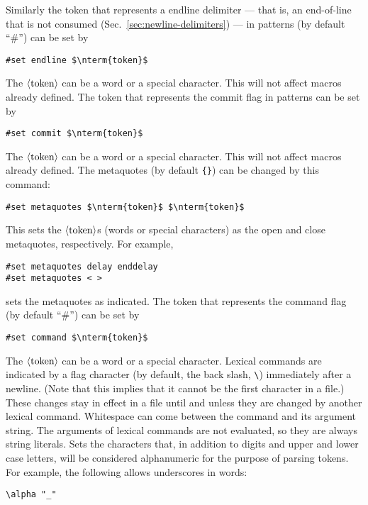 \documentclass[12pt]{article}
\begin{document}
Similarly the token that represents a endline delimiter --- that is, an end-of-line that is not consumed (Sec.\ \ref{sec:newline-delimiters}) --- in patterns (by default ``\#'') can be set by
\begin{lstlisting}[frame=single,mathescape]
#set endline $\nterm{token}$
\end{lstlisting}
The $\langle\mbox{token}\rangle$ can be a word or a special character.
This will not affect macros already defined.
The token that represents the commit flag in patterns can be set by
\begin{lstlisting}[frame=single,mathescape]
#set commit $\nterm{token}$
\end{lstlisting}
The $\langle\mbox{token}\rangle$ can be a word or a special character.
This will not affect macros already defined.
The metaquotes (by default \lstinline"{}") can be changed by this command:
\begin{lstlisting}[frame=single,mathescape]
#set metaquotes $\nterm{token}$ $\nterm{token}$
\end{lstlisting}
This sets the $\langle\mbox{token}\rangle$s (words or special characters) as the open and close metaquotes, respectively.
For example,
\begin{lstlisting}[frame=single]
#set metaquotes delay enddelay
#set metaquotes < >
\end{lstlisting}
sets the metaquotes as indicated.
The token that represents the command flag (by default ``\#'') can be set by
\begin{lstlisting}[frame=single,mathescape]
#set command $\nterm{token}$
\end{lstlisting}
The $\langle\mbox{token}\rangle$ can be a word or a special character.
Lexical commands are indicated by a flag character (by default, the back slash, \verb+\+) immediately after a newline. (Note that this implies that it cannot be the first character in a file.) These changes stay in effect in a file until and unless they are changed by another lexical command. Whitespace can come between the command and its argument string.
The arguments of lexical commands are not evaluated, so they are always string literals.
Sets the characters that, in addition to digits and upper and lower case letters, will be considered alphanumeric for the purpose of parsing tokens. For example, the following allows underscores in words:
\begin{lstlisting}[frame=single]
\alpha "_"
\end{lstlisting}
\end{document}
